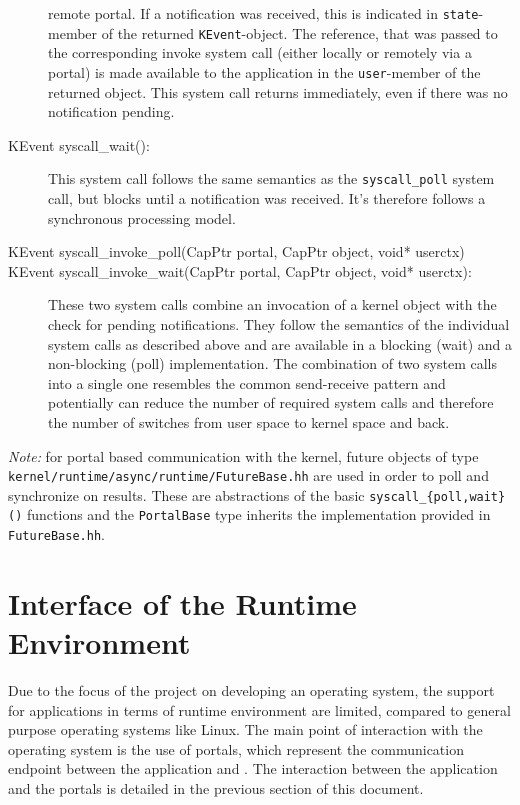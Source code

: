 \begin{description}
remote portal. If a notification was received, this is indicated in
\texttt{state}-member of the returned \texttt{KEvent}-object. The reference,
that was passed to the corresponding invoke system call (either locally or
remotely via a portal) is made available to the application in the
\texttt{user}-member of the returned object. This system call returns
immediately, even if there was no notification pending.
\item[KEvent syscall\_wait():] This system call follows the same semantics as
the \texttt{syscall\_poll} system call, but blocks until a notification was
received. It's therefore follows a synchronous processing model.
\item[KEvent syscall\_invoke\_poll(CapPtr portal, CapPtr object, void* userctx)]
\item[KEvent syscall\_invoke\_wait(CapPtr portal, CapPtr object, void*
userctx):] These two system calls combine an invocation of a kernel object with
the check for pending notifications. They follow the semantics of the individual
system calls as described above and are available in a blocking (wait) and a
non-blocking (poll) implementation. The combination of two system calls into a
single one resembles the common send-receive pattern and potentially can reduce
the number of required system calls and therefore the number of switches from
user space to kernel space and back.
\end{description}

\noindent \emph{Note:} for portal based communication with the kernel, future
objects of type \texttt{kernel/runtime/async/runtime/FutureBase.hh} are used in
order to poll and synchronize on results. These are abstractions of the basic
\texttt{syscall\_\{poll,wait\}()} functions and the \texttt{PortalBase} type
inherits the implementation provided in \texttt{FutureBase.hh}.

\section{Interface of the \mythos Runtime Environment} Due to the focus of the
\mythos project on developing an operating system, the support for applications
in terms of runtime environment are limited, compared to general purpose
operating systems like Linux. The main point of interaction with the operating
system is the use of portals, which represent the communication endpoint between
the application and \mythos. The interaction between the application and the
portals is detailed in the previous section of this document.

